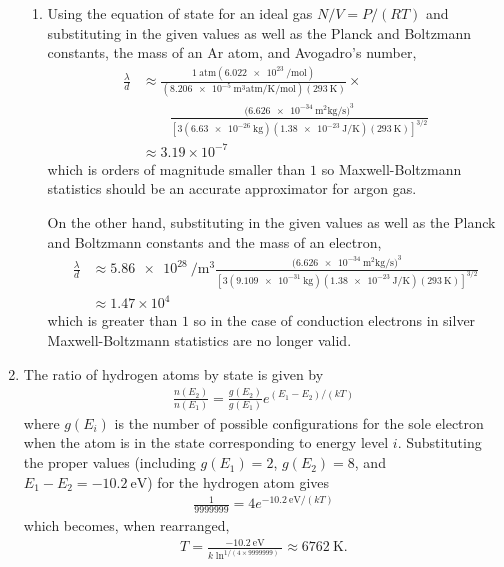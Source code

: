 \documentclass[a4paper,12pt]{article}
\begin{document}
\begin{enumerate}
\begin{enumerate}
            \item
                Using the equation of state for an ideal gas $N / V = P / (RT)$ and substituting in the given values as well as the Planck and Boltzmann constants, the mass of an Ar atom, and Avogadro's number,
                \begin{align*}
                    \frac{\lambda}{d} &\approx \frac{\SI{1}{\text{atm}} \left( \SI{6.022e23}{\per\mol} \right)}{\left( \SI{8.206e-5}{\m\cubed\text{atm}\per\K\per\mol} \right) \left( \SI{293}{\K} \right)} \times \\
                    &\qquad \frac{(\SI{6.626e-34}{\m\squared\kg\per\s)^3}}{\left[ 3(\SI{6.63e-26}{\kg})(\SI{1.38e-23}{\J\per\K})(\SI{293}{\K}) \right]^{3/2}} \\
                    &\approx 3.19 \times 10^{-7}
                \end{align*}
                which is orders of magnitude smaller than $1$ so Maxwell-Boltzmann statistics should be an accurate approximator for argon gas. \par
                On the other hand, substituting in the given values as well as the Planck and Boltzmann constants and the mass of an electron,
                \begin{align*}
                    \frac{\lambda}{d} &\approx \SI{5.86e28}{\per\m\cubed} \frac{(\SI{6.626e-34}{\m\squared\kg\per\s)^3}}{\left[ 3(\SI{9.109e-31}{\kg})(\SI{1.38e-23}{\J\per\K})(\SI{293}{\K}) \right]^{3/2}} \\
                    &\approx 1.47 \times 10^{4}
                \end{align*}
                which is greater than $1$ so in the case of conduction electrons in silver Maxwell-Boltzmann statistics are no longer valid.
        \end{enumerate}

    \item
        The ratio of hydrogen atoms by state is given by
        \begin{align}
            \frac{n(E_2)}{n(E_1)} = \frac{g(E_2)}{g(E_1)} e^{(E_1 - E_2) / (kT)}
        \end{align}
        where $g(E_i)$ is the number of possible configurations for the sole electron when the atom is in the state corresponding to energy level $i$. Substituting the proper values (including $g(E_1) = 2$, $g(E_2) = 8$, and $E_1 - E_2 = \SI{-10.2}{\eV}$) for the hydrogen atom gives
        \begin{align}
            \frac{1}{9999999} = 4e^{\SI{-10.2}{\eV} / (kT)}
        \end{align}
        which becomes, when rearranged,
        \begin{align*}
            T = \frac{\SI{-10.2}{\eV}}{k \ln^{1/(4 \times 9999999)}} \approx \SI{6762}{\K}.
        \end{align*}
\end{enumerate}
\end{document}
